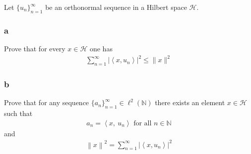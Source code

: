 Let \(\{u_n\}_{n=1}^∞\) be an orthonormal sequence in a Hilbert space
\(\mathcal{H}\).

\hypertarget{a-14}{%
\subsubsection{a}\label{a-14}}

Prove that for every \(x ∈ \mathcal H\) one has
\begin{align*}
\displaystyle\sum_{n=1}^{\infty}\left|\left\langle x, u_{n}\right\rangle\right|^{2} \leq\|x\|^{2}
\end{align*}

\hypertarget{b-13}{%
\subsubsection{b}\label{b-13}}

Prove that for any sequence
\(\{a_n\}_{n=1}^\infty \in \ell^2({\mathbb{N}})\) there exists an
element \(x\in\mathcal H\) such that
\begin{align*}
a_n = {\left\langle {x},~{u_n} \right\rangle} \text{ for all } n\in {\mathbb{N}}
\end{align*}
and
\begin{align*}
{\left\lVert {x} \right\rVert}^2 = \sum_{n=1}^{\infty}\left|\left\langle x, u_{n}\right\rangle\right|^{2}
\end{align*}

